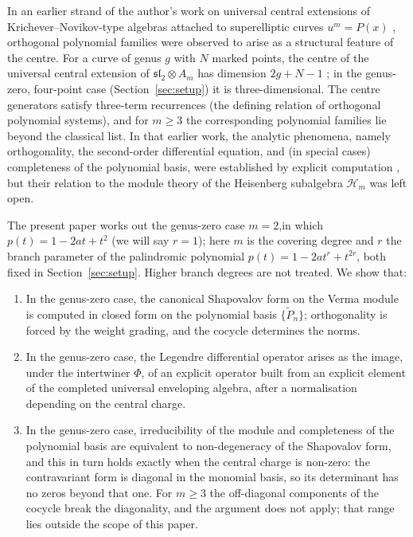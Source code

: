 \documentclass[12pt]{amsart}
\theoremstyle{plain}
\theoremstyle{definition}
\newcommand{\Hm}{{\mathcal{H}_m}}     %
\begin{document}
In an earlier strand of the author's work on universal central
extensions of Krichever--Novikov-type algebras attached to superelliptic
curves $u^m = P(x)$ \cite{SantosNeklyudovFutorny2025,PhiVerma},
orthogonal polynomial families were observed to arise as a structural
feature of the centre. For a curve of genus $g$ with $N$ marked points,
the centre of the universal central extension of
$\mathfrak{sl}_2 \otimes A_m$ has dimension $2g + N - 1$
\cite{Bremner1995,Schlichenmaier2017NPoint}; in the genus-zero,
four-point case (Section~\ref{sec:setup}) it is three-dimensional. The centre
generators satisfy three-term recurrences (the defining relation of
orthogonal polynomial systems), and for $m\ge 3$ the corresponding
polynomial families lie beyond the classical list. In that earlier
work, the analytic phenomena, namely orthogonality, the second-order
differential equation, and (in special cases) completeness of the
polynomial basis, were established by explicit computation
\cite[Thm.~3.4 and \S 4]{SantosNeklyudovFutorny2025}, but their
relation to the module theory of the Heisenberg subalgebra $\Hm$
was left open.

The present paper works out the genus-zero case $m = 2$,in
which $p(t) = 1 - 2at + t^2$ (we will say $r=1$); here $m$ is the covering degree and $r$
the branch parameter of the palindromic polynomial
$p(t) = 1 - 2at^{r} + t^{2r}$, both fixed in
Section~\ref{sec:setup}. Higher branch degrees are not treated. We
show that:
\begin{enumerate}
  \item In the genus-zero case, the canonical Shapovalov form on the
        Verma module is computed in closed form on the polynomial
        basis $\{\tilde{P}_n\}$; orthogonality is forced by the weight
        grading, and the cocycle determines the norms.
  \item In the genus-zero case, the Legendre differential operator arises
        as the image, under the intertwiner $\Phi$, of an explicit
        operator built from an explicit element of the completed
        universal enveloping algebra, after a normalisation depending on
        the central charge.
  \item In the genus-zero case, irreducibility of the module
        and completeness of the polynomial basis are equivalent to
        non-degeneracy of the Shapovalov form, and this in turn holds
        exactly when the central charge is non-zero: the contravariant
        form is diagonal in the monomial basis, so its determinant has
        no zeros beyond that one. For $m\geq 3$ the off-diagonal
        components of the cocycle break the diagonality, and the
        argument does not apply; that range lies outside the scope of
        this paper.
\end{enumerate}
\end{document}
